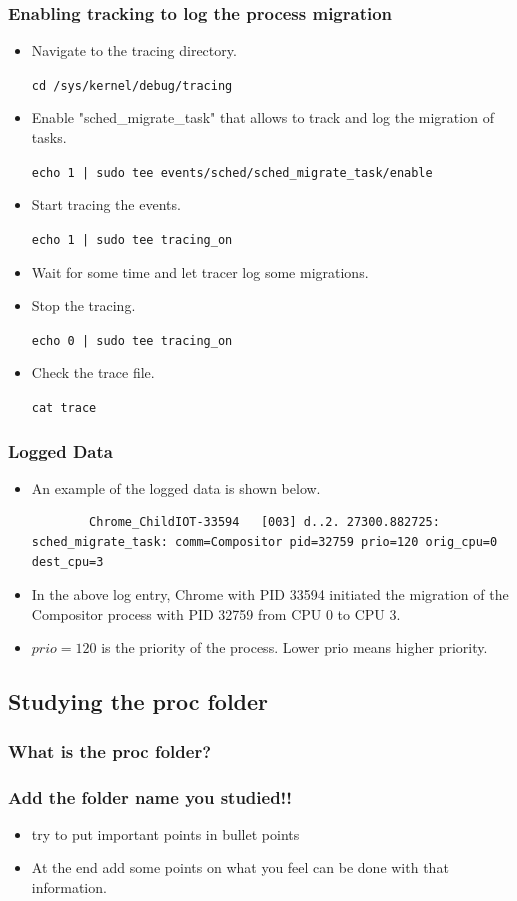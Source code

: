 \documentclass[12pt]{article}
\begin{document}
\subsubsection{Enabling tracking to log the process migration}
\begin{itemize}
    \item Navigate to the tracing directory. 
    
    \texttt{cd /sys/kernel/debug/tracing}
    \item Enable "sched\_migrate\_task" that allows to track and log the migration of tasks.
    
    \texttt{echo 1 | sudo tee events/sched/sched_migrate_task/enable}
    \item Start tracing the events. 
    
    \texttt{echo 1 | sudo tee tracing_on}
    \item Wait for some time and let tracer log some migrations.
    \item Stop the tracing. 
    
    \texttt{echo 0 | sudo tee tracing_on}
    \item Check the trace file. 
    
    \texttt{cat trace}
\end{itemize}
\subsubsection{Logged Data}
\begin{itemize}
    \item An example of the logged data is shown below.
    \begin{verbatim} 
        Chrome_ChildIOT-33594   [003] d..2. 27300.882725: sched_migrate_task: comm=Compositor pid=32759 prio=120 orig_cpu=0 dest_cpu=3
    \end{verbatim}
    \item In the above log entry, Chrome with PID 33594 initiated the migration of the Compositor process with PID 32759 from CPU 0 to CPU 3.
    \item $prio =120$ is the priority of the process. Lower prio means higher priority.
\end{itemize}
\subsection{Studying the proc folder}
\subsubsection{What is the proc folder?}
\subsubsection{Add the folder name you studied!!}
\begin{itemize}
    \item try to put important points in bullet points
    \item At the end add some points on what you feel can be done with that information.
\end{itemize}
\end{document}
